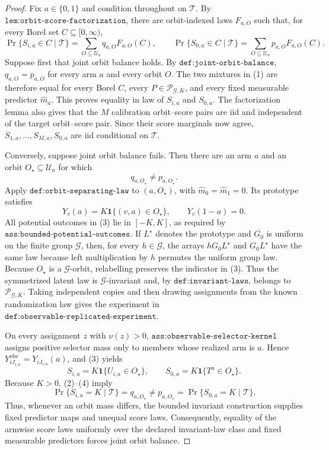 \documentclass{article}
\begin{document}
\begin{proof}
Fix \(a\in\{0,1\}\) and condition throughout on \(\mathcal T\). By \(\texttt{lem:orbit-score-factorization}\), there are orbit-indexed laws \(F_{a,O}\) such that, for every Borel set \(C\subseteq[0,\infty)\),
\[
\Pr\{S_{i,a}\in C\mid\mathcal T\}=\sum_{O\subseteq\mathcal U_a}q_{a,O}F_{a,O}(C),\qquad
\Pr\{S_{0,a}\in C\mid\mathcal T\}=\sum_{O\subseteq\mathcal U_a}p_{a,O}F_{a,O}(C).
\tag{1}
\]
Suppose first that joint orbit balance holds. By \(\texttt{def:joint-orbit-balance}\), \(q_{a,O}=p_{a,O}\) for every arm \(a\) and every orbit \(O\). The two mixtures in (1) are therefore equal for every Borel \(C\), every \(P\in\mathcal P_{\mathcal G,K}\), and every fixed measurable predictor \(\widehat m_a\). This proves equality in law of \(S_{i,a}\) and \(S_{0,a}\). The factorization lemma also gives that the \(M\) calibration orbit--score pairs are iid and independent of the target orbit--score pair. Since their score marginals now agree, \(S_{1,a},\ldots,S_{M,a},S_{0,a}\) are iid conditional on \(\mathcal T\).

Conversely, suppose joint orbit balance fails. Then there are an arm \(a\) and an orbit \(O_\star\subseteq\mathcal U_a\) for which
\[
q_{a,O_\star}\ne p_{a,O_\star}.
\tag{2}
\]
Apply \(\texttt{def:orbit-separating-law}\) to \((a,O_\star)\), with \(\widehat m_0=\widehat m_1=0\). Its prototype satisfies
\[
Y_v(a)=K\mathbf 1\{(v,a)\in O_\star\},\qquad Y_v(1-a)=0.
\tag{3}
\]
All potential outcomes in (3) lie in \([-K,K]\), as required by \(\texttt{ass:bounded-potential-outcomes}\). If \(L^\star\) denotes the prototype and \(G_0\) is uniform on the finite group \(\mathcal G\), then, for every \(h\in\mathcal G\), the arrays \(hG_0L^\star\) and \(G_0L^\star\) have the same law because left multiplication by \(h\) permutes the uniform group law. Because \(O_\star\) is a \(\mathcal G\)-orbit, relabelling preserves the indicator in (3). Thus the symmetrized latent law is \(\mathcal G\)-invariant and, by \(\texttt{def:invariant-laws}\), belongs to \(\mathcal P_{\mathcal G,K}\). Taking independent copies and then drawing assignments from the known randomization law gives the experiment in \(\texttt{def:observable-replicated-experiment}\).

On every assignment \(z\) with \(\nu(z)>0\), \(\texttt{ass:observable-selector-kernel}\) assigns positive selector mass only to members whose realized arm is \(a\). Hence \(Y^{\mathrm{obs}}_{iJ_{i,a}}=Y_{iJ_{i,a}}(a)\), and (3) yields
\[
S_{i,a}=K\mathbf 1\{U_{i,a}\in O_\star\},\qquad
S_{0,a}=K\mathbf 1\{T^a\in O_\star\}.
\tag{4}
\]
Because \(K>0\), (2)--(4) imply
\[
\Pr\{S_{i,a}=K\mid\mathcal T\}=q_{a,O_\star}\ne p_{a,O_\star}=\Pr\{S_{0,a}=K\mid\mathcal T\}.
\tag{5}
\]
Thus, whenever an orbit mass differs, the bounded invariant construction supplies fixed predictor maps and unequal score laws. Consequently, equality of the armwise score laws uniformly over the declared invariant-law class and fixed measurable predictors forces joint orbit balance.


\end{proof}
\end{document}
